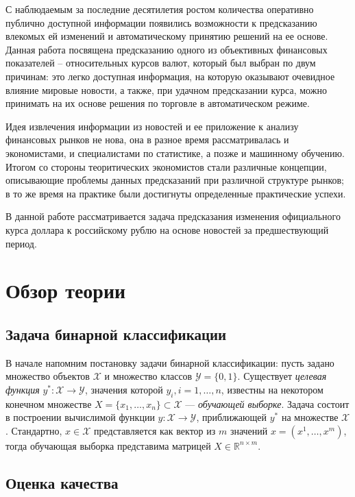 \documentclass[pdftex,ptm,14pt,a4paper]{report}
\begin{document}
С наблюдаемым за последние десятилетия ростом количества оперативно публично доступной информации появились возможности к предсказанию влекомых ей изменений и автоматическому принятию решений на ее основе.
Данная работа посвящена предсказанию одного из объективных финансовых показателей -- относительных курсов валют, который был выбран по двум причинам: это легко доступная информация, на которую оказывают очевидное влияние мировые новости, а также, при удачном предсказании курса, можно принимать на их основе решения по торговле в автоматическом режиме.

Идея извлечения информации из новостей и ее приложение к анализу финансовых рынков не нова, она
в разное время рассматривалась и экономистами, и специалистами по статистике, а позже и машинному обучению.
Итогом со стороны теоритических экономистов стали различные концепции,
описывающие проблемы данных предсказаний при различной структуре рынков; в то же время на практике
были достигнуты определенные практические успехи.

В данной работе рассматривается задача предсказания изменения официального курса доллара к российскому рублю
на основе новостей за предшествующий период.

\tableofcontents

\chapter{Обзор теории}

\section{Задача бинарной классификации}

В начале напомним постановку задачи бинарной классификации\cite{bin_classif}: пусть задано множество объектов $\mathcal{X}$ и
множество классов $\mathcal{Y} = \{0,1\}$.  Существует \textit{целевая функция} $y^*:\mathcal{X}\to\mathcal{Y}$,
значения которой $y_i, i=1,\ldots,n$, известны на некотором конечном множестве
$X = \{x_1,\ldots,x_n\} \subset \mathcal{X}$ --- \textit{обучающей выборке}. Задача состоит в построении вычислимой функции
$y:\mathcal{X}\to\mathcal{Y}$, приближающей $y^*$ на множестве $\mathcal{X}$.
Стандартно, $x\in\mathcal{X}$ представляется как вектор из $m$ значений $x=(x^1,\ldots,x^m)$, тогда обучающая выборка
представима матрицей $X\in \mathbb{R}^{n\times m}$.

\section{Оценка качества}
\end{document}
